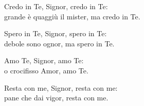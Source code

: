
\strofa Credo in Te, Signor, credo in Te:\\
grande è quaggiù il mister, ma credo in Te.

\spazio


\spazio

\strofa Spero in Te, Signor, spero in Te:\\
debole sono ognor, ma spero in Te.

\spazio


\spazio

\strofa Amo Te, Signor, amo Te:\\
o crocifisso Amor, amo Te.

\spazio


\spazio

\strofa Resta con me, Signor, resta con me:\\
pane che dai vigor, resta con me.

\spazio

